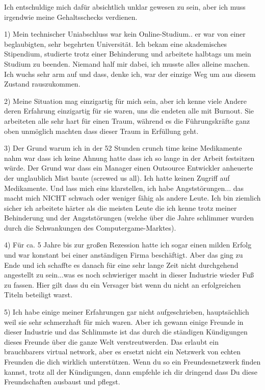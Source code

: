 \documentclass[10pt,a4paper,ngerman,twoside]{article} %
\begin{document}
\begin{multicols}{3}
Ich entschuldige mich dafür absichtlich unklar gewesen zu sein, aber ich muss irgendwie meine Gehaltsschecks verdienen. 

1) Mein technischer Uniabschluss war kein Online-Studium.. er war von einer beglaubigten, sehr begehrten Universität. Ich bekam eine akademisches Stipendium, studierte trotz einer Behinderung und arbeitete halbtags um mein Studium zu beenden. Niemand half mir dabei, ich musste alles alleine machen. Ich wuchs sehr arm auf und dass, denke ich, war der einzige Weg um aus diesem Zustand rauszukommen.

2) Meine Situation mag einzigartig für mich sein, aber ich kenne viele Andere deren Erfahrung einzigartig für sie waren, uns die endeten alle mit Burnout. Sie arbeiteten alle sehr hart für einen Traum, während es die Führungskräfte ganz oben unmöglich machten dass dieser Traum in Erfüllung geht.

3) Der Grund warum ich in der 52 Stunden crunch time keine Medikamente nahm war dass ich keine Ahnung hatte dass ich so lange in der Arbeit festsitzen würde. Der Grund war dass ein Manager einen Outsource Entwickler anheuerte der unglaublich Mist baute (screwed us all). Ich hatte keinen Zugriff auf Medikamente. Und lass mich eins klarstellen, ich habe Angststörungen... das macht mich NICHT schwach oder weniger fähig als andere Leute. Ich bin ziemlich sicher ich arbeitete härter als die meisten Leute die ich kenne trotz meiner Behinderung und der Angststörungen (welche über die Jahre schlimmer wurden durch die Schwankungen des Computergame-Marktes).

4) Für ca. 5 Jahre bis zur großen Rezession hatte ich sogar einen milden Erfolg und war konstant bei einer anständigen Firma beschäftigt. Aber das ging zu Ende und ich schaffte es danach für eine sehr lange Zeit nicht durchgehend angestellt zu sein...was es noch schwieriger macht in dieser Industrie wieder Fuß zu fassen. Hier gilt dass du ein Versager bist wenn du nicht an erfolgreichen Titeln beteiligt warst.

5) Ich habe einige meiner Erfahrungen gar nicht aufgeschrieben, hauptsächlich weil sie sehr schmerzhaft für mich waren. Aber ich gewann einige Freunde in dieser Industrie und das Schlimmste ist das durch die ständigen Kündigungen dieses Freunde über die ganze Welt verstreutwerden. Das erlaubt ein brauchbarers virtual network, aber es ersetzt nicht ein Netzwerk von echten Freunden die dich wirklich unterstützen. Wenn du so ein Freundesnetzwerk finden kannst, trotz all der Kündigungen, dann empfehle ich dir dringend dass Du diese Freundschaften ausbaust und pflegst. 


\end{multicols}
\end{document}
